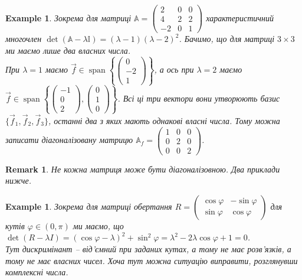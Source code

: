 \documentclass[a4paper, 10pt]{article}
\theoremstyle{theoremdd}
\newtheorem{example}[theorem]{Example}
\newtheorem{remark}[theorem]{Remark}
\DeclareMathOperator{\linspan}{span}
\begin{document}
\begin{example}
Зокрема для матриці $\mathbb{A} = \begin{pmatrix}
2 & 0 & 0 \\
4 & 2 & 2 \\
-2 & 0 & 1
\end{pmatrix}$ характеристичний многочлен $\det (\mathbb{A}-\lambda \mathbb{I}) = (\lambda-1)(\lambda-2)^2$. Бачимо, що для матриці $3 \times 3$ ми маємо лише два власних числа.\\
При $\lambda = 1$ маємо $\vec{f} \in \linspan \left\{ \begin{pmatrix}
0 \\ -2 \\ 1
\end{pmatrix} \right\}$, а ось при $\lambda = 2$ маємо $\vec{f} \in \linspan \left\{ \begin{pmatrix}
-1 \\ 0 \\ 2
\end{pmatrix}, \begin{pmatrix}
0 \\ 1 \\ 0
\end{pmatrix} \right\}$. Всі ці три вектори вони утворюють базис $\{\vec{f}_1,\vec{f}_2,\vec{f}_3 \}$, останні два з яких мають однакові власні числа. Тому можна записати діагоналізовану матрицю $\mathbb{A}_f = \begin{pmatrix}
1 & 0 & 0 \\
0 & 2 & 0 \\
0 & 0 & 2
\end{pmatrix}$.
\end{example}

\begin{remark}
Не кожна матриця може бути діагоналізовною. Два приклади нижче.
\end{remark}

\begin{example}
Зокрема для матриці обертання $R = \begin{pmatrix}
\cos \varphi & -\sin \varphi \\
\sin \varphi & \cos \varphi
\end{pmatrix}$ для кутів $\varphi \in (0,\pi)$ ми маємо, що\\
$\det (R - \lambda I) = (\cos \varphi-\lambda)^2 + \sin^2 \varphi = \lambda^2 - 2\lambda \cos \varphi + 1 = 0$.\\
Тут дискримінант -- від'ємний при заданих кутах, а тому не має розв'язків, а тому не має власних чисел. Хоча тут можна ситуацію виправити, розглянувши комплексні числа.
\end{example}
\end{document}
